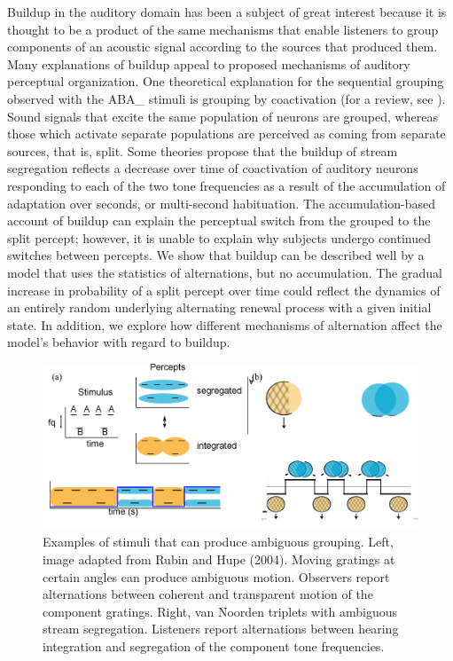 \documentclass[10pt]{article}
\begin{document}
Buildup in the auditory domain has been a subject of great interest because it is thought to be a product of the same mechanisms that enable listeners to group components of an acoustic signal according to the sources that produced them. Many explanations of buildup appeal to proposed mechanisms of auditory perceptual organization. One theoretical explanation for the sequential grouping observed with the ABA_ stimuli is grouping by coactivation (for a review, see \cite{Carlyon2004}). Sound signals that excite the same population of neurons are grouped, whereas those which activate separate populations are perceived as coming from separate sources, that is, split. Some theories \cite{Micheyl2005,Pressnitzer2008,Bee2010} propose that the buildup of stream segregation reflects a decrease over time of coactivation of auditory neurons responding to each of the two tone frequencies as a result of the accumulation of adaptation over seconds, or multi-second habituation. %
The accumulation-based account of buildup can explain the perceptual switch from the grouped to the split percept; however, it is unable to explain why subjects undergo continued switches between percepts. We show that buildup can be described well by a model that uses the statistics of alternations, but no accumulation. The gradual increase in probability of a split percept over time could reflect the dynamics of an entirely random underlying alternating renewal process with a given initial state. In addition, we explore how different mechanisms of alternation affect the model's behavior with regard to buildup.

\begin{figure}
	\centering
	\includegraphics[scale=0.4]{../aba_plaid_stimulus-percepts.png}
	\caption{Examples of stimuli that can produce ambiguous grouping. Left, image adapted from Rubin and Hupe (2004). Moving gratings at certain angles can produce ambiguous motion. Observers report alternations between coherent and transparent motion of the component gratings. Right, van Noorden triplets with ambiguous stream segregation. Listeners report alternations between hearing integration and segregation of the component tone frequencies.}
	\label{fig:percepts_timecourse}
\end{figure}
\end{document}
